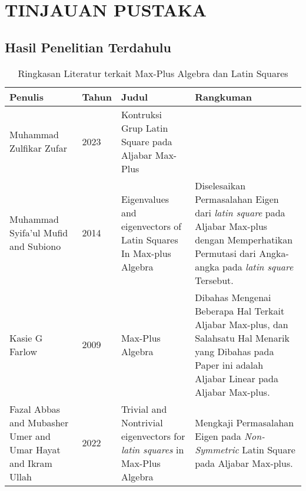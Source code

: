 \pagebreak
\chapter{TINJAUAN PUSTAKA}
\section{Hasil Penelitian Terdahulu}

\begin{table}[h]
  \centering
  \begin{tabular}{|p{3cm}|p{1.2cm}|p{3cm}|p{6cm}|}
    \hline
    \textbf{Penulis}                                                                   & \textbf{Tahun} & \textbf{Judul} & \textbf{Rangkuman}                             \\
    \hline
    Muhammad Zulfikar Zufar                                                            & 2023           & Kontruksi Grup
    Latin Square pada Aljabar Max-Plus                                                 &                                                                                  \\
    \hline

    Muhammad Syifa'ul Mufid and Subiono                                                &
    2014                                                                               &
    Eigenvalues and eigenvectors of Latin Squares In Max-plus Algebra                  &
    Diselesaikan Permasalahan Eigen dari \textit{latin square} pada Aljabar Max-plus dengan Memperhatikan Permutasi dari Angka-angka pada \textit{latin square} Tersebut. \\
    \hline

    Kasie G Farlow                                                                     &
    2009                                                                               &
    Max-Plus Algebra                                                                   &
    Dibahas Mengenai Beberapa Hal Terkait Aljabar Max-plus, dan Salahsatu Hal Menarik yang Dibahas pada Paper ini adalah Aljabar Linear pada Aljabar Max-plus.            \\
    \hline

    Fazal Abbas and Mubasher Umer and Umar Hayat and Ikram Ullah                       &
    2022                                                                               &
    Trivial and Nontrivial eigenvectors for \textit{latin squares} in Max-Plus Algebra &
    Mengkaji Permasalahan Eigen pada \textit{Non-Symmetric} Latin Square pada Aljabar Max-plus.                                                                           \\
    \hline
  \end{tabular}
  \caption{Ringkasan Literatur terkait Max-Plus Algebra dan Latin Squares}
\end{table}



